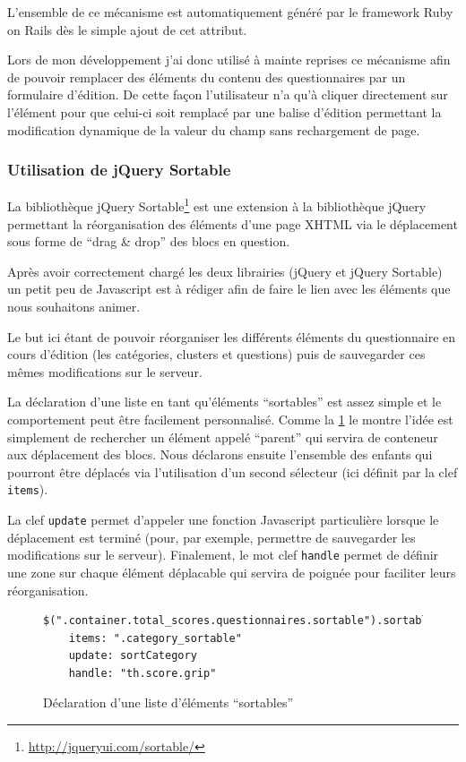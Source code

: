 \documentclass[12pt,a4paper]{book}
\begin{document}
L'ensemble de ce mécanisme est automatiquement généré par le framework Ruby on Rails dès le simple ajout de cet attribut.

Lors de mon développement j'ai donc utilisé à mainte reprises ce mécanisme afin de pouvoir remplacer des éléments du contenu des questionnaires par un formulaire d'édition. De cette façon l'utilisateur n'a qu'à cliquer directement sur l'élément pour que celui-ci soit remplacé par une balise d'édition permettant la modification dynamique de la valeur du champ sans rechargement de page.  

\subsubsection{Utilisation de jQuery Sortable}

La bibliothèque jQuery Sortable\footnote{\url{http://jqueryui.com/sortable/}} est une extension à la bibliothèque jQuery permettant la réorganisation des éléments d'une page XHTML via le déplacement sous forme de ``drag \& drop'' des blocs en question.

Après avoir correctement chargé les deux librairies (jQuery et jQuery Sortable) un petit peu de Javascript est à rédiger afin de faire le lien avec les éléments que nous souhaitons animer.

Le but ici étant de pouvoir réorganiser les différents éléments du questionnaire en cours d'édition (les catégories, clusters et questions) puis de sauvegarder ces mêmes modifications sur le serveur.

La déclaration d'une liste en tant qu'éléments ``sortables'' est assez simple et le comportement peut être facilement personnalisé. Comme la \cref{fig.sort1} le montre l'idée est simplement de rechercher un élément appelé ``parent'' qui servira de conteneur aux déplacement des blocs. Nous déclarons ensuite l'ensemble des enfants qui pourront être déplacés via l'utilisation d'un second sélecteur (ici définit par la clef \texttt{items}).

La clef \texttt{update} permet d'appeler une fonction Javascript particulière lorsque le déplacement est terminé (pour, par exemple, permettre de sauvegarder les modifications sur le serveur). Finalement, le mot clef \texttt{handle} permet de définir une zone sur chaque élément déplacable qui servira de poignée pour faciliter leurs réorganisation.

\begin{figure}[h]
\begin{lstlisting}
$(".container.total_scores.questionnaires.sortable").sortable
    items: ".category_sortable"
    update: sortCategory
    handle: "th.score.grip"
\end{lstlisting}
 \caption{Déclaration d'une liste d'éléments ``sortables''}
 \label{fig.sort1}
\end{figure}
\end{document}

